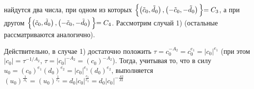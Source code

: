 \documentclass[11pt,reqno]{amsart}
\author{\MakeUppercase{В.Н.\,НЕФЁДОВ}}
\theoremstyle{plain}
\theoremstyle{definition}
\begin{document}
\Russian

найдутся два числа, при одном из которых $\Bigl\{\left({\tilde{c}}_0, {\tilde{d}}_0\right),\left({-\tilde{c}}_0, {-\tilde{d}}_0\right)\Bigl\} = C_3$, а при другом $\Bigl\{\left({\tilde{c}}_0, {\tilde{d}}_0\right),\left({-\tilde{c}}_0, {-\tilde{d}}_0\right)\Bigl\} = C_4$. Рассмотрим случай 1) (остальные рассматриваются аналогично).

Действительно, в случае 1) достаточно положить $\tau = c^{-A_2}_0 = c^{e_1}_0 = |c_0|^{e_1}$ (при этом $|c_0| = \tau^{-1/A_2}$, $\tau=|c_0|^{-A_2}=(c_0)^{-A_2}$). Тогда, учитывая то, что в силу $u_0 = (c_0)^{e_1}(d_0)^{e_2} = |c_0|^{e_1}(d_0)^{e_2}$, выполняется $(u_0)^{\frac{1}{A_1}} = (u_0)^\frac{1}{e_2} = d_0|c_0|^{\frac{e_1}{e_2}} = d_0|c_0|^{-\frac{A2}{A1}}$

\label{lastpage}  %
\end{document}

